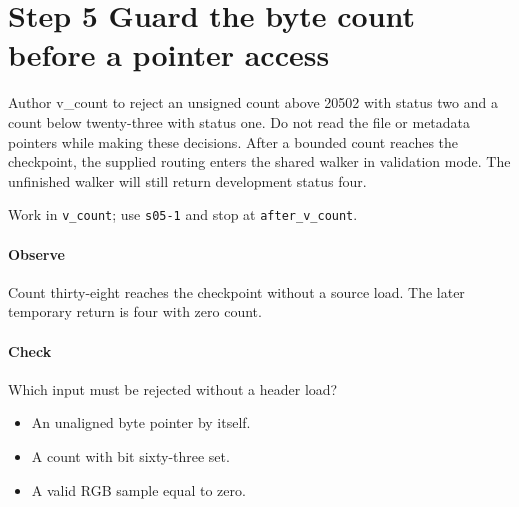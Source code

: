 \section{Step 5 Guard the byte count before a pointer access}\label{qoi-s05}
Author v\_count to reject an unsigned count above 20502 with status two and a count below twenty-three with status one. Do not read the file or metadata pointers while making these decisions. After a bounded count reaches the checkpoint, the supplied routing enters the shared walker in validation mode. The unfinished walker will still return development status four.

Work in \texttt{v\_count}; use \texttt{s05-1} and stop at \texttt{after\_v\_count}.

\paragraph{Observe} Count thirty-eight reaches the checkpoint without a source load. The later temporary return is four with zero count.

\paragraph{Check} Which input must be rejected without a header load?
\begin{itemize}
  \item[A.] An unaligned byte pointer by itself.
  \item[B.] A count with bit sixty-three set.
  \item[C.] A valid RGB sample equal to zero.
\end{itemize}
